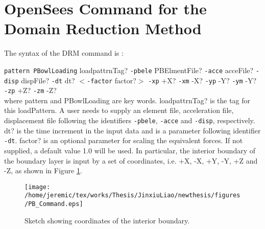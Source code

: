 \section{OpenSees Command for the Domain Reduction Method} 

The syntax of the DRM command is : 

{\texttt{pattern PBowlLoading}} loadpattrnTag? {\texttt{-pbele}} PBElmentFile? 
\texttt{-acce}  acceFile? \texttt{-disp} dispFile? \texttt{-dt}
dt?  $<$\texttt{-factor} factor?$>$ \texttt{-xp} +X? \texttt{-xm} -X?
\texttt{-yp}  -Y? \texttt{-ym} -Y? \texttt{-zp} +Z? \texttt{-zm} 
-Z? \\
%
where pattern and PBowlLoading are key words. loadpattrnTag? is
the tag for this loadPattern. A user needs to supply an element
file,   acceleration  file,  displacement  file  following  the
identifiers      {\texttt{-pbele}},      \texttt{-acce}     and
\texttt{-disp},  respectively. dt? is the time increment in the
input data and is a parameter following identifier \texttt{-dt}.
factor?  is  an  optional  parameter for scaling the equivalent
forces.  If  not  supplied,  a  default value 1.0 will be used.
In  particular,  the interior boundary of the boundary layer is
input  by  a set of coordinates, i.e. +X, -X, +Y, -Y, +Z and -Z,
as shown in Figure \ref{PBDefinition}.
%
\begin{figure}[!htbp]
\begin{center}
\vspace{0.5cm}
\texttt{[image: /home/jeremic/tex/works/Thesis/JinxiuLiao/newthesis/figures/PB\_Command.eps]}
\caption{\label{PBDefinition}  Sketch  showing  coordinates of the
interior boundary.}
\end{center}
\end{figure}





